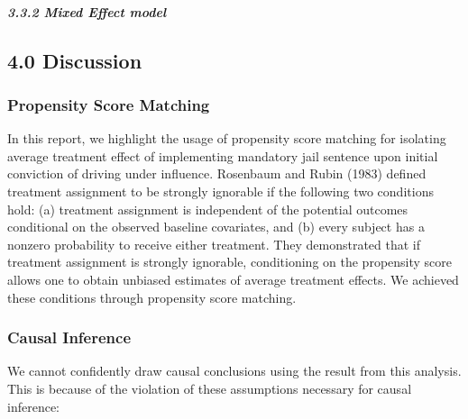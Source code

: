 \documentclass[]{article}
\let\oldsubparagraph\subparagraph
\renewcommand{\subparagraph}[1]{\oldsubparagraph{#1}\mbox{}}
\begin{document}
\hypertarget{mixed-effect-model}{%
\subparagraph{3.3.2 Mixed Effect model}\label{mixed-effect-model}}

\hypertarget{discussion}{%
\subsection{4.0 Discussion}\label{discussion}}

\hypertarget{propensity-score-matching}{%
\subsubsection{Propensity Score Matching}\label{propensity-score-matching}}

In this report, we highlight the usage of propensity score matching for isolating average treatment effect of implementing mandatory jail sentence upon initial conviction of driving under influence. Rosenbaum and Rubin (1983) defined treatment assignment to be strongly ignorable if the following two conditions hold: (a) treatment assignment is independent of the potential outcomes conditional on the observed baseline covariates, and (b) every subject has a nonzero probability to receive either treatment. They demonstrated that if treatment assignment is strongly ignorable, conditioning on the propensity score allows one to obtain unbiased estimates of average treatment effects. We achieved these conditions through propensity score matching.

\hypertarget{causal-inference}{%
\subsubsection{Causal Inference}\label{causal-inference}}

We cannot confidently draw causal conclusions using the result from this analysis. This is because of the violation of these assumptions necessary for causal inference:
\end{document}
